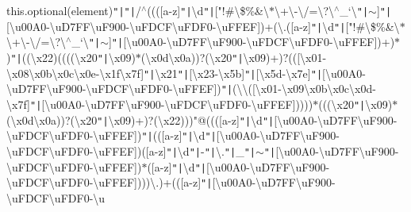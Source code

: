 this.\+optional(element)\texttt{"|}\texttt{"|}/$^\wedge$((([a-\/z]\texttt{"|}\textbackslash{}d\texttt{"|}["!\#\textbackslash{}\$\%\&\textquotesingle{}\textbackslash{}$\ast$\textbackslash{}+\textbackslash{}-\/\textbackslash{}/=\textbackslash{}?\textbackslash{}$^\wedge$\+\_\+`\lcurly{}\textbackslash{}\texttt{"|}\rcurly{}$\sim$]\texttt{"|}[\textbackslash{}u00\+A0-\/\textbackslash{}u\+D7\+F\+F\textbackslash{}u\+F900-\/\textbackslash{}u\+F\+D\+C\+F\textbackslash{}u\+F\+D\+F0-\/\textbackslash{}u\+F\+F\+E\+F])+(\textbackslash{}.([a-\/z]\texttt{"|}\textbackslash{}d\texttt{"|}["!\#\textbackslash{}\$\%\&\textquotesingle{}\textbackslash{}$\ast$\textbackslash{}+\textbackslash{}-\/\textbackslash{}/=\textbackslash{}?\textbackslash{}$^\wedge$\+\_\+`\lcurly{}\textbackslash{}\texttt{"|}\rcurly{}$\sim$]\texttt{"|}[\textbackslash{}u00\+A0-\/\textbackslash{}u\+D7\+F\+F\textbackslash{}u\+F900-\/\textbackslash{}u\+F\+D\+C\+F\textbackslash{}u\+F\+D\+F0-\/\textbackslash{}u\+F\+F\+E\+F])+)$\ast$)\texttt{"|}((\textbackslash{}x22)((((\textbackslash{}x20\texttt{"|}\textbackslash{}x09)$\ast$(\textbackslash{}x0d\textbackslash{}x0a))?(\textbackslash{}x20\texttt{"|}\textbackslash{}x09)+)?(([\textbackslash{}x01-\/\textbackslash{}x08\textbackslash{}x0b\textbackslash{}x0c\textbackslash{}x0e-\/\textbackslash{}x1f\textbackslash{}x7f]\texttt{"|}\textbackslash{}x21\texttt{"|}[\textbackslash{}x23-\/\textbackslash{}x5b]\texttt{"|}[\textbackslash{}x5d-\/\textbackslash{}x7e]\texttt{"|}[\textbackslash{}u00\+A0-\/\textbackslash{}u\+D7\+F\+F\textbackslash{}u\+F900-\/\textbackslash{}u\+F\+D\+C\+F\textbackslash{}u\+F\+D\+F0-\/\textbackslash{}u\+F\+F\+E\+F])\texttt{"|}(\textbackslash{}\textbackslash{}([\textbackslash{}x01-\/\textbackslash{}x09\textbackslash{}x0b\textbackslash{}x0c\textbackslash{}x0d-\/\textbackslash{}x7f]\texttt{"|}[\textbackslash{}u00\+A0-\/\textbackslash{}u\+D7\+F\+F\textbackslash{}u\+F900-\/\textbackslash{}u\+F\+D\+C\+F\textbackslash{}u\+F\+D\+F0-\/\textbackslash{}u\+F\+F\+E\+F]))))$\ast$(((\textbackslash{}x20\texttt{"|}\textbackslash{}x09)$\ast$(\textbackslash{}x0d\textbackslash{}x0a))?(\textbackslash{}x20\texttt{"|}\textbackslash{}x09)+)?(\textbackslash{}x22)))"@((([a-\/z]\texttt{"|}\textbackslash{}d\texttt{"|}[\textbackslash{}u00\+A0-\/\textbackslash{}u\+D7\+F\+F\textbackslash{}u\+F900-\/\textbackslash{}u\+F\+D\+C\+F\textbackslash{}u\+F\+D\+F0-\/\textbackslash{}u\+F\+F\+E\+F])\texttt{"|}(([a-\/z]\texttt{"|}\textbackslash{}d\texttt{"|}[\textbackslash{}u00\+A0-\/\textbackslash{}u\+D7\+F\+F\textbackslash{}u\+F900-\/\textbackslash{}u\+F\+D\+C\+F\textbackslash{}u\+F\+D\+F0-\/\textbackslash{}u\+F\+F\+E\+F])([a-\/z]\texttt{"|}\textbackslash{}d\texttt{"|}-\/\texttt{"|}\textbackslash{}.\texttt{"|}\+\_\+\texttt{"|}$\sim$\texttt{"|}[\textbackslash{}u00\+A0-\/\textbackslash{}u\+D7\+F\+F\textbackslash{}u\+F900-\/\textbackslash{}u\+F\+D\+C\+F\textbackslash{}u\+F\+D\+F0-\/\textbackslash{}u\+F\+F\+E\+F])$\ast$([a-\/z]\texttt{"|}\textbackslash{}d\texttt{"|}[\textbackslash{}u00\+A0-\/\textbackslash{}u\+D7\+F\+F\textbackslash{}u\+F900-\/\textbackslash{}u\+F\+D\+C\+F\textbackslash{}u\+F\+D\+F0-\/\textbackslash{}u\+F\+F\+E\+F])))\textbackslash{}.)+(([a-\/z]\texttt{"|}[\textbackslash{}u00\+A0-\/\textbackslash{}u\+D7\+F\+F\textbackslash{}u\+F900-\/\textbackslash{}u\+F\+D\+C\+F\textbackslash{}u\+F\+D\+F0-\/\textbackslash{}u\